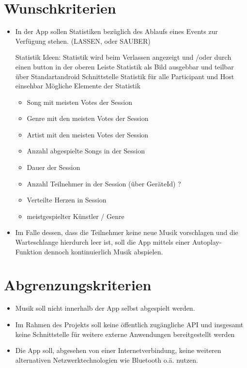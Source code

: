 \documentclass[oneside, ngerman]{sdqtechreport}
\begin{document}
\section{Wunschkriterien}
\label{sec:Zielbestimmungen:Wunschkriterien}
\begin{itemize}
    \item In der App sollen Statistiken bezüglich des Ablaufs eines Events zur Verfügung stehen. (LASSEN, oder SAUBER)
    
    Statistik Ideen:
    Statistik wird beim Verlassen angezeigt und /oder durch einen button in der oberen Leiste
    Statistik als Bild ausgebbar und teilbar über Standartandroid Schnittstelle
    Statistik für alle Participant und Host einsehbar
    Mögliche Elemente der Statistik
    \begin{itemize}
        \item Song mit meisten Votes der Session
        \item Genre mit den meisten Votes der Session
        \item Artist mit den meisten Votes der Session
        \item Anzahl abgespielte Songs in der Session
        \item Dauer der Session
        \item Anzahl Teilnehmer in der Session (über GeräteId) ?
        \item Verteilte Herzen in Session
        \item meistgespielter Künstler / Genre
    \end{itemize}
  
    \item Im Falle dessen, dass die Teilnehmer keine neue Musik vorschlagen und die Warteschlange hierdurch leer ist, soll die App mittels einer Autoplay-Funktion dennoch kontinuierlich Musik abspielen.

\end{itemize}

\section{Abgrenzungskriterien}
\label{sec:Zielbestimmungen:Abgrenzungskriterien}
\begin{itemize}
    \item Musik soll nicht innerhalb der App selbst abgespielt werden.
    \item Im Rahmen des Projekts soll keine öffentlich zugängliche API und insgesamt keine Schnittstelle für weitere externe Anwendungen bereitgestellt werden
    \item Die App soll, abgesehen von einer Internetverbindung, keine weiteren alternativen Netzwerktechnologien wie Bluetooth o.ä. nutzen.

\end{itemize}
\end{document}
